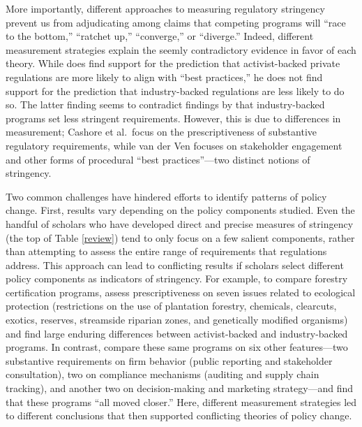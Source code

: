 \documentclass[
      12pt,
            Review ]{article}
\begin{document}
More importantly, different approaches to measuring regulatory stringency prevent us from adjudicating among claims that competing programs will ``race to the bottom,'' ``ratchet up,'' ``converge,'' or ``diverge.'' Indeed, different measurement strategies explain the seemly contradictory evidence in favor of each theory. While \citet{VanderVen2015} does find support for the prediction that activist-backed private regulations are more likely to align with ``best practices,'' he does not find support for the prediction that industry-backed regulations are less likely to do so. The latter finding seems to contradict findings by \citet{Cashore2004} that industry-backed programs set less stringent requirements. However, this is due to differences in measurement; Cashore et al.~focus on the prescriptiveness of substantive regulatory requirements, while van der Ven focuses on stakeholder engagement and other forms of procedural ``best practices''---two distinct notions of stringency.

Two common challenges have hindered efforts to identify patterns of policy change. First, results vary depending on the policy components studied. Even the handful of scholars who have developed direct and precise measures of stringency (the top of Table \ref{review}) tend to only focus on a few salient components, rather than attempting to assess the entire range of requirements that regulations address. This approach can lead to conflicting results if scholars select different policy components as indicators of stringency. For example, to compare forestry certification programs, \citet{Cashore2004} assess prescriptiveness on seven issues related to ecological protection (restrictions on the use of plantation forestry, chemicals, clearcuts, exotics, reserves, streamside riparian zones, and genetically modified organisms) and find large enduring differences between activist-backed and industry-backed programs. In contrast, \citet{Overdevest2014} compare these same programs on six other features---two substantive requirements on firm behavior (public reporting and stakeholder consultation), two on compliance mechanisms (auditing and supply chain tracking), and another two on decision-making and marketing strategy---and find that these programs ``all moved closer.'' Here, different measurement strategies led to different conclusions that then supported conflicting theories of policy change.
\end{document}
